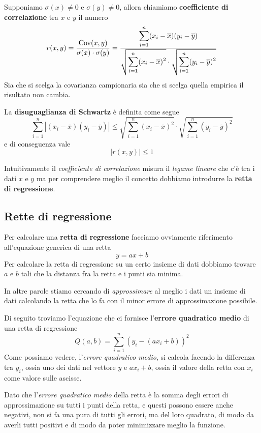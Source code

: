 \begin{definition}
	Supponiamo $\sigma (x) \neq 0$ e $\sigma (y) \neq 0$, allora chiamiamo \textbf{coefficiente di correlazione}
	tra $x$ e $y$ il numero
	\[
		r(x, y) = \frac{\operatorname{Cov} (x, y)}{\sigma (x) \cdot \sigma (y)} =
		\frac{\displaystyle\sum_{i=1}^n (x_i - \overline{x})(y_i - \overline{y})}
		{\sqrt{\displaystyle\sum_{i=1}^n (x_i - \overline{x})^2} \cdot
			\sqrt{\displaystyle\sum_{i=1}^n (y_i - \overline{y})^2}}
	\]
	Sia che si scelga la covarianza campionaria sia che si scelga quella empirica il risultato non cambia.
\end{definition}

\begin{definition}
	La \textbf{disuguaglianza di Schwartz} è definita come segue
	\[
		\sum_{i=1}^n |(x_i - \overline{x}) (y_i - \overline{y})| \leq
		\sqrt{\sum_{i=1}^n (x_i - \overline{x})^2} \cdot \sqrt{\sum_{i=1}^n (y_i - \overline{y})^2}
	\]
	e di conseguenza vale \[ |r(x, y)| \leq 1 \]
\end{definition}

Intuitivamente il \emph{coefficiente di correlazione} misura il \emph{legame lineare} che c'è tra i dati $x$ e
$y$ ma per comprendere meglio il concetto dobbiamo introdurre la \textbf{retta di regressione}.

\subsection{Rette di regressione}
Per calcolare una \textbf{retta di regressione} facciamo ovviamente riferimento all'equazione generica di una
retta
\[ y = a x + b \]
Per calcolare la retta di regressione su un certo insieme di dati dobbiamo trovare $a$ e $b$ tali che la distanza
fra la retta e i punti sia minima.

In altre parole stiamo cercando di \emph{approssimare} al meglio i dati un insieme di dati calcolando la retta
che lo fa con il minor errore di approssimazione possibile.

Di seguito troviamo l'equazione che ci fornisce l'\textbf{errore quadratico medio} di una retta di regressione
\[ Q(a, b) = \sum_{i=1}^n (y_i - (a x_i + b))^2 \]
Come possiamo vedere, l'\emph{errore quadratico medio}, si calcola facendo la differenza tra $y_i$, ossia uno
dei dati nel vettore $y$ e $a x_i + b$, ossia il valore della retta con $x_i$ come valore sulle ascisse.

Dato che l'\emph{errore quadratico medio} della retta è la somma degli errori di approssimazione su tutti i
punti della retta, e questi possono essere anche negativi, non si fa una pura di tutti gli errori, ma del loro
quadrato, di modo da averli tutti positivi e di modo da poter minimizzare meglio la funzione.

